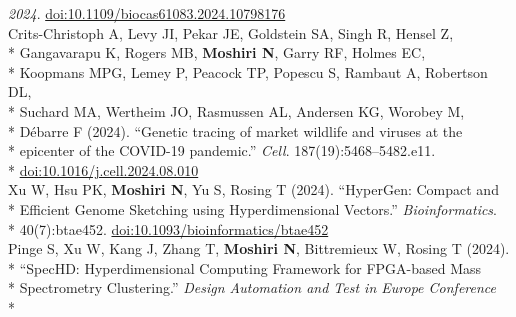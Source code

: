 \documentclass[margin,line]{res}
\begin{document}
\begin{resume}
\hspace*{8mm} \textit{2024}. \href{http://doi.org/10.1109/biocas61083.2024.10798176}{doi:10.1109/biocas61083.2024.10798176}\\
\hspace*{4mm} Crits-Christoph A, Levy JI, Pekar JE, Goldstein SA, Singh R, Hensel Z,\\*
\hspace*{9mm} Gangavarapu K, Rogers MB, \textbf{Moshiri N}, Garry RF, Holmes EC,\\*
\hspace*{9mm} Koopmans MPG, Lemey P, Peacock TP, Popescu S, Rambaut A, Robertson DL,\\*
\hspace*{9mm} Suchard MA, Wertheim JO, Rasmussen AL, Andersen KG, Worobey M,\\*
\hspace*{9mm} D\'{e}barre F (2024). ``Genetic tracing of market wildlife and viruses at the\\*
\hspace*{9mm} epicenter of the COVID-19 pandemic.'' \textit{Cell}. 187(19):5468--5482.e11.\\*\vspace{2mm}
\hspace*{8mm} \href{https://doi.org/10.1016/j.cell.2024.08.010}{doi:10.1016/j.cell.2024.08.010}\\
\hspace*{4mm} Xu W, Hsu PK, \textbf{Moshiri N}, Yu S, Rosing T (2024). ``HyperGen: Compact and\\*
\hspace*{9mm} Efficient Genome Sketching using Hyperdimensional Vectors.'' \textit{Bioinformatics}.\\*\vspace{2mm}
\hspace*{8mm} 40(7):btae452. \href{https://doi.org/10.1093/bioinformatics/btae452}{doi:10.1093/bioinformatics/btae452}\\
\hspace*{4mm} Pinge S, Xu W, Kang J, Zhang T, \textbf{Moshiri N}, Bittremieux W, Rosing T (2024).\\*
\hspace*{9mm} ``SpecHD: Hyperdimensional Computing Framework for FPGA-based Mass\\*
\hspace*{9mm} Spectrometry Clustering.'' \textit{Design Automation and Test in Europe Conference}\\*\vspace{2mm}

\end{resume}
\end{document}
